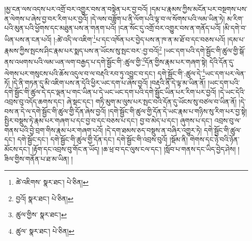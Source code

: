 །མྱ་ངན་ལས་འདས་པར་འགྲོ་བར་འགྱུར་བས་ན་བསྟེན་པར་བྱ་བའོ། །དམ་པ་རྣམས་ཀྱིས་མངོན་པར་བསྔགས་པས་ན་ལེགས་པ་ཞེས་བྱ་བར་རིག་པར་བྱའོ། །དེ་ལས་བཟློག་པ་ནི་ལོག་པའི་ལྟ་བ་ལ་སོགས་པའི་ལམ་ཡིན་ཏེ། མ་རིག་པའི་མུན་པའི་ཕྱོགས་དང་མཐུན་པས་ན་གནག་པའོ། །ངན་སོང་དུ་འགྲོ་བར་འགྱུར་བས་ན་གནོད་པའོ། །མི་དགེ་བ་ཡིན་པས་ན་ངན་པའོ། །:ཚེ་འདི་ལ་འཇིག་\footnote{ཚེ་འཇིགས་  སྣར་ཐང་།  པེ་ཅིན། }པ་དང་འཁོན་པར་བྱེད་པས་ན་ཁ་ན་མ་ཐོ་བ་དང་བཅས་པའོ། །དམ་པ་རྣམས་ཀྱིས་སྤངས་ཤིང་རྣམ་པར་སྨད་པས་ན་ཡོངས་སུ་སྤང་བར་:བྱ་བའོ།\footnote{བྱའོ།  སྣར་ཐང་།  པེ་ཅིན། } །ཡང་དག་པའི་དགེ་སྦྱོང་གི་ཚུལ་གྱི་སྒོ་ནས་འཕགས་པའི་ལམ་ཡན་ལག་བརྒྱད་པ་དགེ་སྦྱོང་གི་:ཚུལ་གྱི་\footnote{ཚུལ་གྱིས་  སྣར་ཐང་། }དོན་གྱིས་རྣམ་པར་གཞག་སྟེ། དེའི་དོན་དུ་ལེགས་པར་གསུངས་པའི་ཆོས་འདུལ་བ་ལ་བརྡའི་རབ་ཏུ་འབྱུང་བ་དང་། དགེ་སྦྱོང་གི་:ཚུལ་དེ་\footnote{ཚུལ་  སྣར་ཐང་།  པེ་ཅིན། }ཡང་དག་པར་ལེན་ཏོ། །དེ་ནི་གཏན་དུ་མི་འཇིག་པས་ན་དེའི་ཕྱིར་ཡང་དག་པ་ཞེས་བྱའོ། །བརྡའི་ནི་དེ་ལྟ་མ་ཡིན་ནོ། །ཡང་དག་པའི་དགེ་སྦྱོང་གི་ཚུལ་དེ་དང་ལྡན་པ་གང་ཡིན་པ་དེ་ཡང་ཡང་དག་པའི་དགེ་སྦྱོང་ཡིན་པར་རིག་པར་བྱའོ། །དེ་ཡང་དེའི་འབྲས་བུ་འདོད་ཆགས་དང་། ཞེ་སྡང་དང་། གཏི་མུག་མ་ལུས་པར་སྤང་བའི་དོན་དུ་ཡོངས་སུ་བཙལ་བ་ཡིན་ནོ། །དེ་བས་ན་དེ་ལ་དགེ་སྦྱོང་གི་ཚུལ་གྱི་དོན་ཞེས་བྱའོ། །དགེ་སྦྱོང་གི་ཚུལ་གྱི་དོན་དེ་ཡང་རྣམ་པ་གཉིས་སུ་རིག་པར་བྱ་སྟེ། སྤྱིར་བསྡུས་ཏེ་རྣམ་པར་གཞག་པ་དང་བྱ་བ་དང་བཅས་པ་དང་། བྱ་བ་མེད་པ་དང་། ཞུགས་པ་དང་། འབྲས་བུ་ལ་གནས་པའི་བྱེ་བྲག་གིས་རྣམ་པར་གཞག་པའོ། །དེ་དག་ཐམས་ཅད་བསྡུས་ན་བཞིར་འགྱུར་ཏེ། དགེ་སྦྱོང་གི་ཚུལ་དང་། དགེ་སྦྱོང་དང་། དགེ་སྦྱོང་གི་ཚུལ་གྱི་དོན་དང་། དགེ་སྦྱོང་གི་འབྲས་བུའོ། །སྡོམ་ནི། གེགས་དང་ཉེ་བའི་ཉོན་མོངས་དང་། །རྟོག་དང་འབྲས་བུ་གོང་ན་ཡོད། །ཆ་ཕྲ་བ་དང་ལུས་ངལ་དང་། །སློབ་པ་གནས་དང་ཡིད་བྱེད་ཤེས། །ཟིལ་གྱིས་གནོན་པ་ཐ་མ་ཡིན། །
